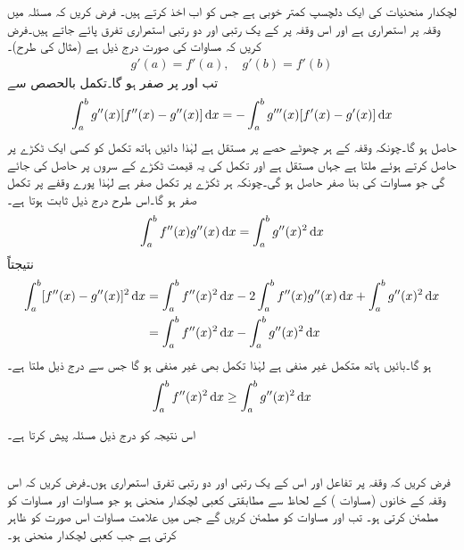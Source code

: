 لچکدار منحنیات کی ایک دلچسپ کمتر خوبی ہے جس کو اب اخذ کرتے ہیں۔ فرض کریں کہ مسئلہ  میں وقفہ  پر  استمراری ہے اور اس وقفہ پر  کے یک رتبی اور  دو رتبی استمراری تفرق پائے جاتے ہیں۔فرض کریں کہ مساوات  کی صورت درج ذیل ہے (مثال  کی طرح)۔
\begin{align}\label{مساوات_اعدادی_کمتر_خوبی_الف}
g'(a)=f'(a),\quad g'(b)=f'(b)
\end{align} 
تب  اور  پر  صفر ہو گا۔تکمل بالحصص سے
\begin{align*}
\int_a^b g''(x)[f''(x)-g''(x)]\dif x=-\int_a^b g'''(x)[f'(x)-g'(x)]\dif x
\end{align*}
حاصل ہو گا۔چونکہ وقفہ کے ہر چھوٹے حصے پر  مستقل ہے لہٰذا دائیں ہاتھ تکمل کو کسی ایک ٹکڑے پر حاصل کرتے ہوئے    ملتا ہے جہاں  مستقل ہے اور تکمل کی یہ قیمت ٹکڑے کے سروں پر حاصل کی جائے گی جو مساوات  کی بنا صفر حاصل ہو گی۔چونکہ ہر ٹکڑے پر تکمل صفر ہے لہٰذا پورے وقفے پر تکمل صفر ہو گا۔اس طرح درج ذیل ثابت ہوتا ہے۔
\begin{align*}
\int_a^b f''(x)g''(x)\dif x=\int_a^b g''(x)^2\dif x
\end{align*}
نتیجتاً
\begin{align*}
\int_a^b[f''(x)-g''(x)]^2\dif x&=\int_a^b f''(x)^2\dif x-2\int_a^b f''(x)g''(x)\dif x+\int_a^b g''(x)^2\dif x\\
&=\int_a^b f''(x)^2\dif x-\int_a^b g''(x)^2\dif x
\end{align*}
ہو گا۔بائیں ہاتھ متکمل غیر منفی ہے لہٰذا تکمل بھی غیر منفی ہو گا جس سے درج ذیل ملتا ہے۔
\begin{align}\label{مساوات_اعدادی_کمتر_خوبی_ب}
\int_a^b f''(x)^2\dif x\ge \int_a^b g''(x)^2\dif x
\end{align}

اس نتیجہ کو درج ذیل مسئلہ پیش کرتا ہے۔

\quad {}\\
فرض کریں کہ وقفہ  پر تفاعل  اور اس کے یک رتبی اور دو رتبی تفرق استمراری ہوں۔فرض کریں کہ اس وقفہ کے  خانوں  (مساوات ) کے لحاظ سے   مطابقتی کعبی لچکدار منحنی ہو جو  مساوات  اور مساوات  کو مطمئن کرتی ہو۔ تب  اور  مساوات  کو مطمئن کریں گے جس میں  علامت مساوات  اس صورت کو ظاہر کرتی ہے جب  کعبی لچکدار منحنی  ہو۔


